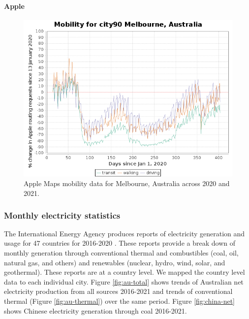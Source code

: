 \documentclass[final,3p,times,authoryear]{elsarticle}
\begin{document}
\paragraph{Apple}
\begin{figure}
\centering
\includegraphics[width=.99\linewidth]{images/Applecity90MelbourneAustralia.png}
\caption{Apple Maps mobility data for Melbourne, Australia across 2020 and 2021.}
 \label{fig:apple}
\end{figure}

\subsubsection{Monthly electricity statistics}
The International Energy Agency produces reports of electricity generation and usage for 47 countries for 2016-2020 \citep{IEA2021}. These reports provide a break down of monthly generation through conventional thermal and combustibles (coal, oil, natural gas, and others) and renewables (nuclear, hydro, wind, solar, and geothermal). These reports are at a country level. We mapped the country level data to each individual city. Figure \ref{fig:au-total} shows trends of Australian net electricity production from all sources 2016-2021 and trends of conventional thermal (Figure \ref{fig:au-thermal}) over the same period. Figure \ref{fig:china-net} shows Chinese electricity generation through coal 2016-2021.
\end{document}
